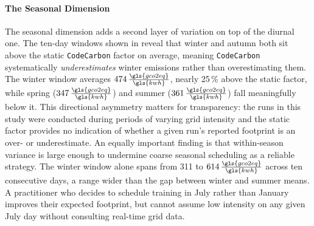 \paragraph{The Seasonal Dimension}
The seasonal dimension adds a second layer of variation on top of the diurnal one. The ten-day windows shown in  reveal that winter and autumn both sit above the static \texttt{CodeCarbon} factor on average, meaning \texttt{CodeCarbon} systematically \textit{underestimates} winter emissions rather than overestimating them. The winter window averages $474\,\frac{\gls{gco2eq}}{\gls{kwh}}$, nearly 25\,\% above the static factor, while spring ($347\,\frac{\gls{gco2eq}}{\gls{kwh}}$) and summer ($361\,\frac{\gls{gco2eq}}{\gls{kwh}}$) fall meaningfully below it. This directional asymmetry matters for transparency: the runs in this study were conducted during periods of varying grid intensity and the static factor provides no indication of whether a given run's reported footprint is an over- or underestimate. An equally important finding is that within-season variance is large enough to undermine coarse seasonal scheduling as a reliable strategy. The winter window alone spans from 311 to $614\,\frac{\gls{gco2eq}}{\gls{kwh}}$ across ten consecutive days, a range wider than the gap between winter and summer means. A practitioner who decides to schedule training in July rather than January improves their expected footprint, but cannot assume low intensity on any given July day without consulting real-time grid data.

